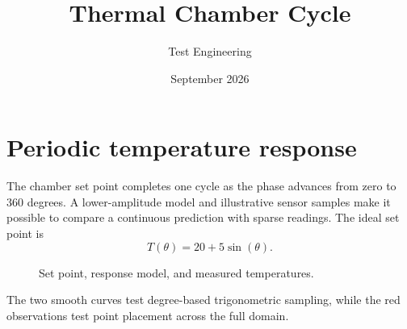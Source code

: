 \documentclass{article}
\title{Thermal Chamber Cycle}
\author{Test Engineering}
\date{September 2026}
\begin{document}
\maketitle

\section{Periodic temperature response}
The chamber set point completes one cycle as the phase advances from zero
to 360 degrees. A lower-amplitude model and illustrative sensor samples
make it possible to compare a continuous prediction with sparse readings.
The ideal set point is
\begin{equation}
T(\theta) = 20 + 5\sin(\theta).
\end{equation}

\begin{figure}
\centering
{}
\caption{Set point, response model, and measured temperatures.}
\label{fig:thermal-cycle}
\end{figure}

The two smooth curves test degree-based trigonometric sampling, while the
red observations test point placement across the full domain.
\end{document}
